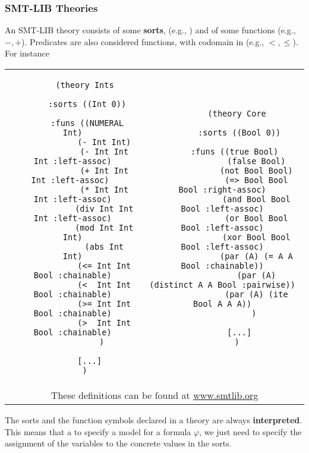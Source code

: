 \begin{frame}[fragile]
  \frametitle{SMT-LIB Theories}

  \scriptsize

  An SMT-LIB theory consists of some {\bf sorts}, (e.g., \SInt) 
  and of some functions (e.g., $-,+$). 
  Predicates are also considered functions, with codomain in \SBoo
  (e.g., $<,\leq$). \pause For instance

  \vfill
  \begin{tabular}{cc}
  \begin{minipage}{.4\textwidth}
  \tiny
  \begin{verbatim}
     (theory Ints

      :sorts ((Int 0))
     
      :funs ((NUMERAL Int)
             (- Int Int)
             (- Int Int Int :left-assoc)
             (+ Int Int Int :left-assoc) 
             (* Int Int Int :left-assoc)
             (div Int Int Int :left-assoc)
             (mod Int Int Int)
             (abs Int Int)
             (<= Int Int Bool :chainable)
             (<  Int Int Bool :chainable)
             (>= Int Int Bool :chainable)
             (>  Int Int Bool :chainable)
            )

       [...]
     )
   \end{verbatim}
   \end{minipage}
   &
   \begin{minipage}{.4\textwidth}
     \tiny
      \begin{verbatim}
      (theory Core

       :sorts ((Bool 0))

       :funs ((true Bool)  
              (false Bool)
              (not Bool Bool)
              (=> Bool Bool Bool :right-assoc)
              (and Bool Bool Bool :left-assoc)
              (or Bool Bool Bool :left-assoc)
              (xor Bool Bool Bool :left-assoc)
              (par (A) (= A A Bool :chainable))
              (par (A) (distinct A A Bool :pairwise))
              (par (A) (ite Bool A A A))
             )

       [...]
      )
      \end{verbatim}
      \end{minipage} \\
    \multicolumn{2}{c}{\tiny These definitions can be found at \url{www.smtlib.org}}
  \end{tabular}
  \vfill
  \pause

  The sorts and the function symbols declared in a theory are always {\bf interpreted}.
  This means that a to specify a model for a formula $\varphi$, we just need to specify 
  the assignment of the variables to the concrete values in the sorts.

\end{frame}

